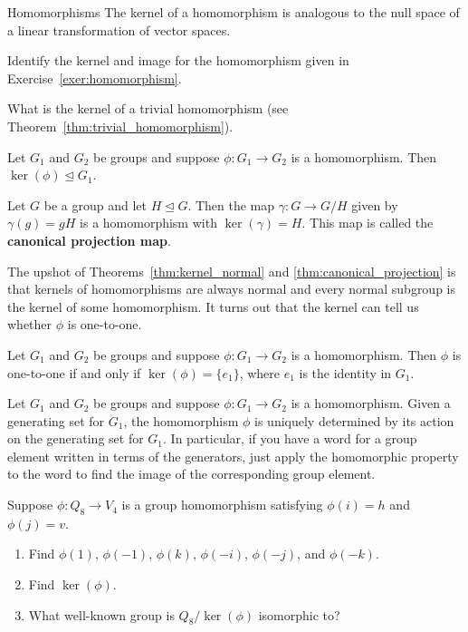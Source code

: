 \begin{section}{Homomorphisms}
The kernel of a homomorphism is analogous to the null space of a linear transformation of vector spaces.  

\begin{exercise}
Identify the kernel and image for the homomorphism given in Exercise~\ref{exer:homomorphism}.
\end{exercise}

\begin{exercise}
What is the kernel of a trivial homomorphism (see Theorem~\ref{thm:trivial_homomorphism}).
\end{exercise}

\begin{theorem}\label{thm:kernel_normal}
Let $G_1$ and $G_2$ be groups and suppose $\phi:G_1\to G_2$ is a homomorphism. Then $\ker(\phi)\trianglelefteq G_1$.
\end{theorem}

\begin{theorem}\label{thm:canonical_projection}
Let $G$ be a group and let $H\trianglelefteq G$.  Then the map $\gamma:G\to G/H$ given by $\gamma(g)=gH$ is a homomorphism with $\ker(\gamma)=H$. This map is called the \textbf{canonical projection map}.
\end{theorem}

The upshot of Theorems~\ref{thm:kernel_normal} and \ref{thm:canonical_projection} is that kernels of homomorphisms are always normal and every normal subgroup is the kernel of some homomorphism. It turns out that the kernel can tell us whether $\phi$ is one-to-one.

\begin{theorem}
Let $G_1$ and $G_2$ be groups and suppose $\phi:G_1\to G_2$ is a homomorphism. Then $\phi$ is one-to-one if and only if $\ker(\phi)=\{e_1\}$, where $e_1$ is the identity in $G_1$.
\end{theorem}

\begin{remark}
Let $G_1$ and $G_2$ be groups and suppose $\phi:G_1\to G_2$ is a homomorphism. Given a generating set for $G_1$, the homomorphism $\phi$ is uniquely determined by its action on the generating set for $G_1$.  In particular, if you have a word for a group element written in terms of the generators, just apply the homomorphic property to the word to find the image of the corresponding group element.
\end{remark}

\begin{exercise}\label{exer:Q8toV4}
Suppose $\phi: Q_8\to V_{4}$ is a group homomorphism satisfying $\phi(i)=h$ and $\phi(j)=v$.
\begin{enumerate}[label=\rm{(\alph*)}]
\item Find $\phi(1)$, $\phi(-1)$, $\phi(k)$, $\phi(-i)$, $\phi(-j)$, and $\phi(-k)$.
\item Find $\ker(\phi)$.
\item What well-known group is $Q_8/\ker(\phi)$ isomorphic to?
\end{enumerate}
\end{exercise}


\end{section}
